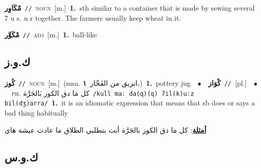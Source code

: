 \documentclass[10pt,a4paper,twoside]{article} %
\begin{document}
\begin{multicols}{2}
{\setlength\topsep{0pt}\textbf{\foreignlanguage{arabic}{مْكَاوِر}}\ {\color{gray}\texttt{//}\color{black}}\ \textsc{noun}\ [m.]\ \textbf{1.}~sth similar to a container that is made by sewing several 7 u s. u r together. The farmers usually keep wheat in it.\ } \vspace{2mm}

{\setlength\topsep{0pt}\textbf{\foreignlanguage{arabic}{مْكَوَّر}}\ {\color{gray}\texttt{//}\color{black}}\ \textsc{adj}\ [m.]\ \textbf{1.}~ball-like\ } \vspace{2mm}

\vspace{-3mm}
\subsection*{\color{blue}\foreignlanguage{arabic}{ك.و.ز}\color{blue}{}} 

{\setlength\topsep{0pt}\textbf{\foreignlanguage{arabic}{كُوز}}\ {\color{gray}\texttt{//}\color{black}}\ \textsc{noun}\ [m.]\ \color{gray}(msa. \foreignlanguage{arabic}{ابريق من الفَخّار}~\foreignlanguage{arabic}{\textbf{١.}})\color{black}\ \textbf{1.}~pottery jug\ \ $\bullet$\ \ \setlength\topsep{0pt}\textbf{\foreignlanguage{arabic}{كْوَاز}}\ {\color{gray}\texttt{//}\color{black}}\ [pl.]\ \ $\bullet$\ \ \textsc{ph.} \color{gray} \foreignlanguage{arabic}{كل مَا دق الكوز بَالجَرَّة}\color{black}\ {\color{gray}\texttt{/{\sffamily kull maː da(q)(q) ʔil(k)uːz bil(dʒ)arra}/}\color{black}}\ \textbf{1.}~it is an idiomatic expression that means that sb does or says a bad thing habitually\  \begin{flushright}\color{gray}\foreignlanguage{arabic}{\textbf{\underline{\foreignlanguage{arabic}{أمثلة}}}: كل ما دق الكوز بالجَرَّة أنت بتطلبي الطلاق ما عادت عيشة هاي}\end{flushright}\color{black}} \vspace{2mm}

\vspace{-3mm}
\subsection*{\color{blue}\foreignlanguage{arabic}{ك.و.س}\color{blue}{}} 


\end{multicols}
\end{document}
